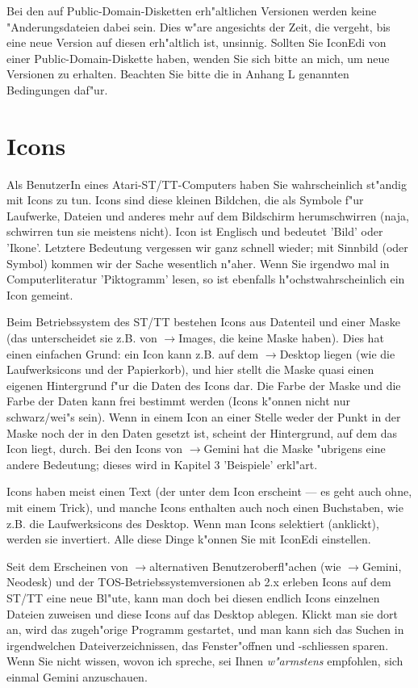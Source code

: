 Bei den auf Public-Domain-Disketten erh"altlichen 
Versionen werden keine "Anderungsdateien dabei sein. Dies w"are
angesichts der Zeit, die vergeht, bis eine neue Version
auf diesen erh"altlich ist, unsinnig. Sollten Sie
IconEdi von einer Public-Domain-Diskette haben, wenden
Sie sich bitte an mich, um neue Versionen zu erhalten.
Beachten Sie bitte die in Anhang L genannten Bedingungen 
daf"ur.

\section{Icons}  

Als BenutzerIn eines Atari-ST/TT-Computers haben Sie 
wahrscheinlich st"andig mit Icons zu tun. Icons sind diese 
kleinen Bildchen, die als Symbole f"ur Laufwerke, Dateien und 
anderes mehr auf dem Bildschirm herumschwirren (naja, schwirren 
tun sie meistens nicht). Icon ist Englisch und bedeutet 'Bild' 
oder 'Ikone'. Letztere Bedeutung vergessen wir ganz schnell 
wieder; mit Sinnbild (oder Symbol) kommen wir der Sache 
wesentlich n"aher. Wenn Sie irgendwo mal in Computerliteratur 
'Piktogramm' lesen, so ist ebenfalls h"ochstwahrscheinlich ein 
Icon gemeint. 

   
Beim Betriebssystem des ST/TT bestehen Icons aus Datenteil
und einer Maske (das unterscheidet sie z.B. von $\to$Images,
 die keine Maske haben). Dies hat einen einfachen 
Grund: ein Icon kann z.B. auf dem $\to$Desktop 
liegen (wie die Laufwerksicons und der Papierkorb), und hier stellt 
die Maske quasi einen eigenen Hintergrund f"ur die Daten des Icons 
dar. Die Farbe der Maske und die Farbe der Daten kann frei bestimmt
werden (Icons k"onnen nicht nur schwarz/wei"s sein). Wenn in einem
Icon an einer Stelle weder der Punkt in der Maske noch der 
in den Daten gesetzt ist, scheint der Hintergrund, auf 
dem das Icon liegt, durch. Bei den Icons von $\to$Gemini 
 hat die Maske "ubrigens eine andere Bedeutung; 
dieses wird in Kapitel 3 'Beispiele' erkl"art. 

Icons haben meist einen Text (der unter dem Icon erscheint 
--- es geht auch ohne, mit einem Trick), und manche Icons 
enthalten auch noch einen Buchstaben, wie z.B. die 
Laufwerksicons des Desktop. Wenn man Icons selektiert (anklickt),
werden sie invertiert. Alle diese Dinge k"onnen Sie mit
IconEdi einstellen.

Seit dem Erscheinen von $\to$alternativen Benutzeroberfl"achen 
 (wie $\to$Gemini,
 Neodesk) und der TOS-Betriebssystemversionen 
ab 2.x erleben Icons auf dem ST/TT eine neue Bl"ute, kann man
doch bei diesen endlich Icons einzelnen Dateien zuweisen und 
diese Icons auf das Desktop ablegen. Klickt man sie dort 
an, wird das zugeh"orige Programm gestartet, und man kann sich 
das Suchen in irgendwelchen Dateiverzeichnissen, das 
Fenster"offnen und -schliessen sparen. Wenn Sie nicht wissen, 
wovon ich spreche, sei Ihnen {\sl w"armstens} empfohlen, sich 
einmal Gemini anzuschauen.

